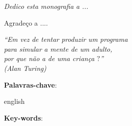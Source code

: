 
\begin{dedicatoria}
   \vspace*{\fill}
   \centering
   \noindent
   \textit{ Dedico esta monografia a ...} 
   \vspace*{\fill}
\end{dedicatoria}


\begin{agradecimentos}

Agradeço a ....

\end{agradecimentos}


\begin{epigrafe}
    \vspace*{\fill}
	\begin{flushright}
		\textit{``Em vez de tentar produzir um programa \\para simular a mente de um adulto,\\ por que não a de uma criança $?$''\\
		(Alan Turing)}
	\end{flushright}
\end{epigrafe}


\setlength{\absparsep}{18pt} %
\begin{resumo}
    \imprimirresumo
    \par\noindent
    \textbf{Palavras-chave}: \imprimirpalavraschave
\end{resumo}

\begin{resumo}[Abstract]
    \begin{otherlanguage*}{english}
        \imprimirabstract
        \par\noindent 
        \textbf{Key-words}: \imprimirkeywords
    \end{otherlanguage*}
\end{resumo}

\listoffigures*
\cleardoublepage


